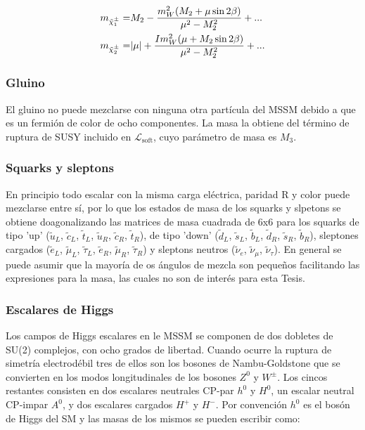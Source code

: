 \begin{equation}
	\begin{split}
		m_{\chinoonepm} = & M_2 - \frac{m_W^2 (M_2 + \mu \sin{2\beta})}{\mu^2 - M_2^2} + ... \\
		m_{\chinotwopm} = & |\mu| + \frac{I m_W^2 (\mu + M_2 \sin{2\beta})}{\mu^2 - M_2^2} + ... \\
	\end{split}
\end{equation}

\subsubsection{Gluino}

El gluino no puede mezclarse con ninguna otra partícula del MSSM debido a
que es un fermión de color de ocho componentes. La masa la obtiene del término de ruptura de SUSY incluido en $\mathcal{L}_{\text{soft}}$, cuyo parámetro de masa es $M_3$.

\subsubsection{Squarks y sleptons}

En principio todo escalar con la misma carga eléctrica, paridad R y color puede mezclarse entre sí, por lo que los estados de masa de los squarks y slpetons se obtiene doagonalizando las matrices de masa cuadrada de 6x6 para los squarks de tipo 'up' ($\tilde{u}_L$, $\tilde{c}_L$, $\tilde{t}_L$, $\tilde{u}_R$, $\tilde{c}_R$, $\tilde{t}_R$), de tipo 'down' ($\tilde{d}_L$, $\tilde{s}_L$, $\tilde{b}_L$, $\tilde{d}_R$, $\tilde{s}_R$, $\tilde{b}_R$), sleptones cargados ($\tilde{e}_L$, $\tilde{\mu}_L$, $\tilde{\tau}_L$, $\tilde{e}_R$, $\tilde{\mu}_R$, $\tilde{\tau}_R$) y sleptons neutros ($\tilde{\nu}_e$, $\tilde{\nu}_{\mu}$, $\tilde{\nu}_{\tau}$). En general se puede asumir que la mayoría de os ángulos de mezcla son pequeños facilitando las expresiones para la masa, las cuales no son de interés para esta Tesis.


\subsubsection{Escalares de Higgs}

Los campos de Higgs escalares en le MSSM se componen de dos dobletes de SU(2) complejos, con ocho grados de libertad. Cuando ocurre la ruptura de simetría electrodébil tres de ellos son los bosones de Nambu-Goldstone que se convierten en los modos longitudinales de los bosones $Z^0$ y $W^{\pm}$. Los cincos restantes consisten en dos escalares neutrales CP-par $h^0$ y $H^0$, un escalar neutral CP-impar $A^0$, y dos escalares cargados $H^+$ y $H^-$. Por convención $h^0$ es el bosón de Higgs del SM y las masas de los mismos se pueden escribir como:

